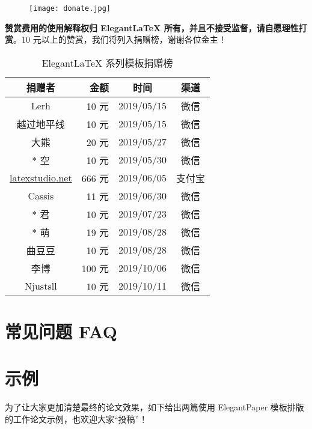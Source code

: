 \documentclass[lang=cn,11pt,a4paper]{elegantpaper}
\begin{document}
\begin{figure}[htbp]
  \centering
  \texttt{[image: donate.jpg]}
\end{figure}

\textbf{赞赏费用的使用解释权归 Elegant\LaTeX{} 所有，并且不接受监督，请自愿理性打赏}。10 元以上的赞赏，我们将列入捐赠榜，谢谢各位金主！

\begin{table}[!htbp]
  \centering
  \caption{Elegant\LaTeX{} 系列模板捐赠榜}
  \begin{tabular}{crcc}
    \toprule
    捐赠者   & 金额 & 时间 & 渠道 \\
    \midrule
    Lerh  & 10 元  & 2019/05/15 & 微信 \\
    越过地平线 & 10 元    & 2019/05/15 & 微信 \\
    大熊 &  20 元 & 2019/05/27 & 微信 \\
    * 空 & 10 元 & 2019/05/30 & 微信\\
    \href{http://www.latexstudio.net/}{latexstudio.net} & 666 元 & 2019/06/05 & 支付宝\\
    Cassis & 11 元 & 2019/06/30 & 微信\\
    * 君 & 10 元 & 2019/07/23 & 微信\\
    * 萌 & 19 元 & 2019/08/28 & 微信 \\
    曲豆豆 & 10 元 & 2019/08/28 & 微信 \\
    李博 & 100 元 & 2019/10/06 & 微信\\
    Njustsll & 10 元 & 2019/10/11 & 微信 \\
  \bottomrule
  \end{tabular}%
\end{table}%

\section{常见问题 FAQ}



\section{示例}

为了让大家更加清楚最终的论文效果，如下给出两篇使用 ElegantPaper 模板排版的工作论文示例，也欢迎大家“投稿”！


\end{document}
